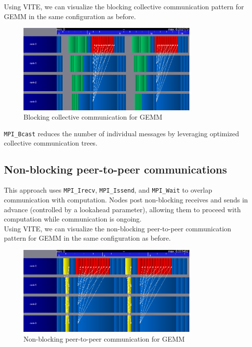 \documentclass[12pt,a4paper]{article}
\begin{document}
Using VITE, we can visualize the blocking collective communication pattern for GEMM in the same configuration as before.
\begin{figure}[H]
    \centering
    \includegraphics[width=0.8\textwidth]{src/bcast.png}
    \caption{Blocking collective communication for GEMM}
    \label{fig:bcast}
\end{figure}

\texttt{MPI\_Bcast} reduces the number of individual messages by leveraging optimized collective communication trees.


\subsection{Non-blocking peer-to-peer communications}

This approach uses \texttt{MPI\_Irecv}, \texttt{MPI\_Issend}, and \texttt{MPI\_Wait} to overlap communication with computation.
Nodes post non-blocking receives and sends in advance (controlled by a lookahead parameter), allowing them to proceed with computation while communication is ongoing. \\

Using VITE, we can visualize the non-blocking peer-to-peer communication pattern for GEMM in the same configuration as before.
\begin{figure}[H]
    \centering
    \includegraphics[width=0.8\textwidth]{src/p2p-i-la.png}
    \caption{Non-blocking peer-to-peer communication for GEMM}
    \label{fig:p2p_i_la}
\end{figure}
\end{document}
